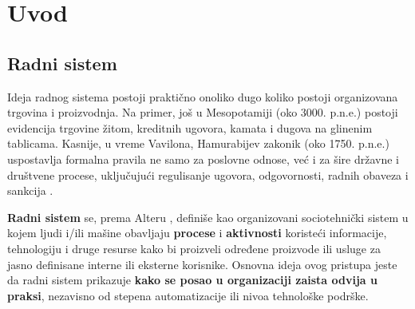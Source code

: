 \chapter{Uvod}

\section{Radni sistem}\label{sec:radni-sistem}

Ideja radnog sistema postoji praktično onoliko dugo koliko postoji organizovana trgovina i proizvodnja. Na primer, još u Mesopotamiji (oko 3000. p.n.e.) postoji evidencija trgovine žitom, kreditnih ugovora, kamata i dugova na glinenim tablicama. Kasnije, u vreme Vavilona, Hamurabijev zakonik (oko 1750. p.n.e.) uspostavlja formalna pravila ne samo za poslovne odnose, već i za šire državne i društvene procese, uključujući regulisanje ugovora, odgovornosti, radnih obaveza i sankcija \cite{carmona2007accounting}.



\textbf{Radni sistem}  se, prema Alteru \cite{alter2013work}, definiše kao organizovani sociotehnički sistem u kojem ljudi i/ili mašine obavljaju \textbf{procese} i \textbf{aktivnosti} koristeći informacije, tehnologiju i druge resurse kako bi proizveli određene proizvode ili usluge za jasno definisane interne ili eksterne korisnike. Osnovna ideja ovog pristupa jeste da radni sistem prikazuje \textbf{kako se posao u organizaciji zaista odvija u praksi}, nezavisno od stepena automatizacije ili nivoa tehnološke podrške.
 
